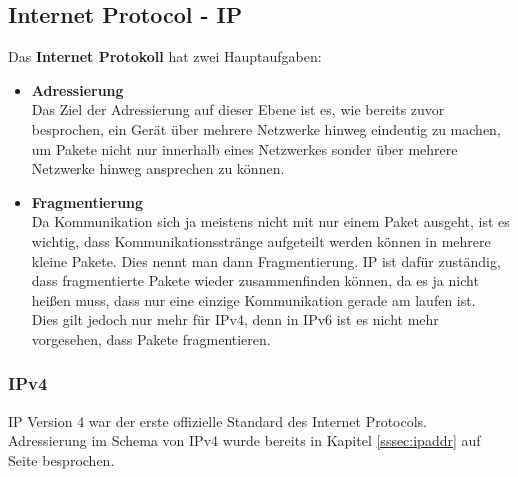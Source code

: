 \documentclass[12pt,a4paper]{report}
\begin{document}
\subsection{Internet Protocol - IP}\label{ssec:ip}
Das \textbf{Internet Protokoll} hat zwei Hauptaufgaben:
\begin{itemize}
\item \textbf{Adressierung}\\
Das Ziel der Adressierung auf dieser Ebene ist es, wie bereits zuvor besprochen, ein Gerät über mehrere Netzwerke hinweg eindeutig zu machen, um Pakete nicht nur innerhalb eines Netzwerkes sonder über mehrere Netzwerke hinweg ansprechen zu können.
\item \textbf{Fragmentierung}\\
Da Kommunikation sich ja meistens nicht mit nur einem Paket ausgeht, ist es wichtig, dass Kommunikationsstränge aufgeteilt werden können in mehrere kleine Pakete. Dies nennt man dann Fragmentierung. IP ist dafür zuständig, dass fragmentierte Pakete wieder zusammenfinden können, da es ja nicht heißen muss, dass nur eine einzige Kommunikation gerade am laufen ist.\\
Dies gilt jedoch nur mehr für IPv4, denn in IPv6 ist es nicht mehr vorgesehen, dass Pakete fragmentieren.
\end{itemize}
\subsubsection{IPv4}
IP Version 4 war der erste offizielle Standard des Internet Protocols.\\
Adressierung im Schema von IPv4 wurde bereits in Kapitel \ref{sssec:ipaddr} auf Seite \pageref{sssec:ipaddr} besprochen.\\
\end{document}
